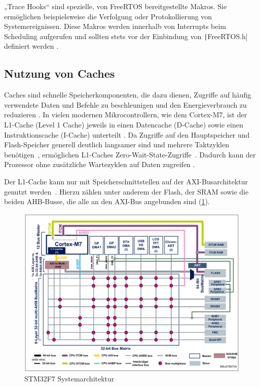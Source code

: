 „Trace Hooks“ sind spezielle, von FreeRTOS bereitgestellte Makros. Sie
ermöglichen beispielsweise die Verfolgung oder Protokollierung von
Systemereignissen. Diese Makros werden innerhalb von Interrupts beim Scheduling
aufgerufen und sollten stets vor der Einbindung von
\texttt|FreeRTOS.h| definiert werden \cite{freertos_rtos_trace_hooks}.

\subsection{Nutzung von Caches}

Caches sind schnelle Speicherkomponenten, die dazu dienen, Zugriffe auf häufig
verwendete Daten und Befehle zu beschleunigen und den Energieverbrauch zu
reduzieren \cite{ka001150}. In vielen modernen Mikrocontrollern, wie dem
Cortex-M7, ist der L1-Cache (Level 1 Cache) jeweils in einen Datencache
(D-Cache) sowie einen Instruktionscache (I-Cache) unterteilt \cite[S.
6]{an4667}. Da Zugriffe auf den Hauptspeicher und Flash-Speicher generell
deutlich langsamer sind und mehrere Taktzyklen
benötigen~\cite{stm32_memory_sections}, ermöglichen L1-Caches
Zero-Wait-State-Zugriffe~\cite[S. 6]{an4667}. Dadurch kann der Prozessor ohne
zusätzliche Wartezyklen auf Daten zugreifen \cite{waitstate_wiki}.

Der L1-Cache kann nur mit Speicherschnittstellen auf der \ac{AXI}-Busarchitektur
genutzt werden~\cite[S. 4]{an4839}. Hierzu zählen unter anderem der Flash, der
\ac{SRAM} sowie die beiden \ac{AHB}-Busse, die alle an den AXI-Bus angebunden
sind (\ref{fig:m7_sys_arch}).

\begin{figure}[htb]
    \centering
    \includegraphics[width=1\textwidth]{assets/m7_system_arch}
    \caption{STM32F7 Systemarchitektur \cite[S. 9]{an4667}}
    \label{fig:m7_sys_arch}
\end{figure}

